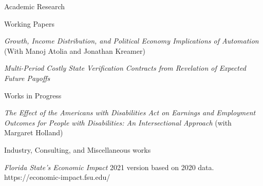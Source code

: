 \documentclass{resume} %
\begin{document}
\begin{rSection}{Academic Research}

\begin{rSubsection}{Working Papers}{}{}{}
    \item {\em Growth, Income Distribution, and Political Economy Implications of Automation} (With Manoj Atolia and Jonathan Kreamer)
    \item {\em Multi-Period Costly State Verification Contracts from Revelation of Expected Future Payoffs}
\end{rSubsection}

\begin{rSubsection}{Works in Progress}{}{}{}
    \item {\em The Effect of the Americans with Disabilities Act on Earnings and Employment Outcomes for People with Disabilities: An Intersectional Approach} (with Margaret Holland)
\end{rSubsection}

\end{rSection}

\begin{rSection}{Industry, Consulting, and Miscellaneous works}
	\item {\em Florida State's Economic Impact} 2021 version based on 2020 data. https://economic-impact.fsu.edu/
	
\end{rSection}





\end{document}
